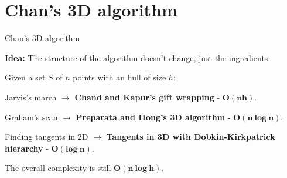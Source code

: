 \documentclass[14pt, handout]{beamer}
\begin{document}
\section{Chan's 3D algorithm}
\begin{frame}{Chan's 3D algorithm}
	\begin{center}
		\vspace{-2mm}
		\begin{fullpageitemize}
			\item<1->[\rtarrow] \textbf{Idea:} The structure of the algorithm doesn't change, just the ingredients.
	
			\fontsize{12}{14}\notosansfont
			\begin{sublist}
				\vspace{2mm}
				\item<2->[] Given a set $S$ of $n$ points with an hull of size $h$:
				\vspace{2mm}
				\item<3-> Jarvis's march $\longrightarrow$ \textbf{Chand and Kapur's gift wrapping} - \textcolor{colorgreen}{$\bm{O(nh)}$}.
				\item<4-> Graham's scan $\longrightarrow$ \textbf{Preparata and Hong's 3D algorithm} - \textcolor{colorgreen}{$\bm{O(n\ log\ n)}$}.
				\item<5-> Finding tangents in 2D $\longrightarrow$ \textbf{Tangents in 3D with Dobkin-Kirkpatrick hierarchy} - \textcolor{colorgreen}{$\bm{O(log\ n)}$}.
			\end{sublist}		
		
			\item<6-> The overall complexity is still \textcolor{colorgreen}{$\bm{O(n\ log\ h)}$}.
		\end{fullpageitemize}	
	\end{center}
\end{frame}

\end{document}

